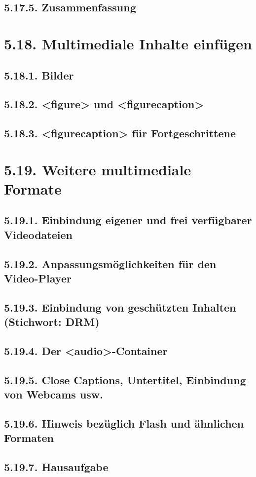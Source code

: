 \subsection{5.17.5.	Zusammenfassung}
\section{5.18.	Multimediale Inhalte einfügen}
\subsection{5.18.1.	Bilder}
\subsection{5.18.2.	<figure> und <figurecaption>}
\subsection{5.18.3.	<figurecaption> für Fortgeschrittene}
\section{5.19.	Weitere multimediale Formate}
\subsection{5.19.1.	Einbindung eigener und frei verfügbarer Videodateien}
\subsection{5.19.2.	Anpassungsmöglichkeiten für den Video-Player}
\subsection{5.19.3.	Einbindung von geschützten Inhalten (Stichwort: DRM)}
\subsection{5.19.4.	Der <audio>-Container}
\subsection{5.19.5.	Close Captions, Untertitel, Einbindung von Webcams usw.}
\subsection{5.19.6.	Hinweis bezüglich Flash und ähnlichen Formaten}
\subsection{5.19.7.	Hausaufgabe}
